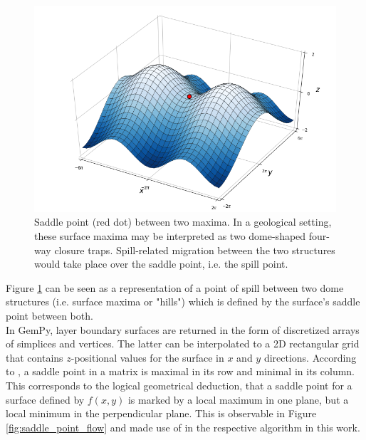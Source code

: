 			\begin{figure}[h]
				\centering
				\includegraphics[width=1\textwidth]{Figures/Saddle_Point_between_maxima.png}
				\caption{Saddle point (red dot) between two maxima. In a geological setting, these surface maxima may be interpreted as two dome-shaped four-way closure traps. Spill-related migration between the two structures would take place over the saddle point, i.e. the spill point.}\label{fig:saddle_point_maxima}
			\end{figure}
			Figure \ref{fig:saddle_point_maxima} can be seen as a representation of a point of spill between two dome structures (i.e. surface maxima or "hills") which is defined by the surface's saddle point between both.\\			
			In GemPy, layer boundary surfaces are returned in the form of discretized arrays of simplices and vertices. The latter can be interpolated to a 2D rectangular grid that contains $z$-positional values for the surface in $x$ and $y$ directions. According to \citet{verschelde2017programmingtools}, a saddle point in a matrix is maximal in its row and minimal in its column. This corresponds to the logical geometrical deduction, that a saddle point for a surface defined by $f(x,y)$ is marked by a local maximum in one plane, but a local minimum in the perpendicular plane. This is observable in Figure \ref{fig:saddle_point_flow} and made use of in the respective algorithm in this work.
